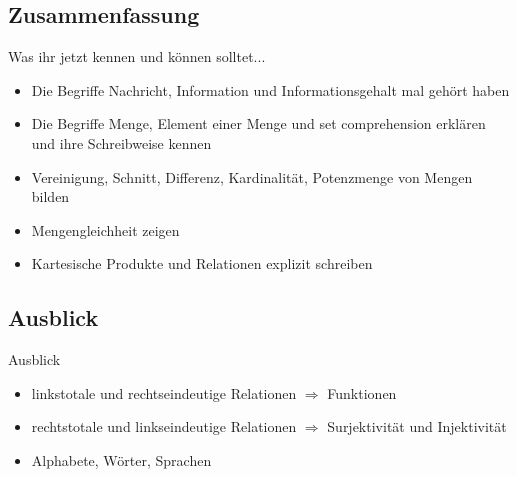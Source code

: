 \subsection{Zusammenfassung}
	\begin{frame}{Was ihr jetzt kennen und können solltet...}
			\begin{itemize}
				\item Die Begriffe Nachricht, Information und Informationsgehalt mal gehört haben
				\item Die Begriffe Menge, Element einer Menge und set comprehension erklären und ihre Schreibweise kennen
				\item Vereinigung, Schnitt, Differenz, Kardinalität, Potenzmenge von Mengen bilden
				\item Mengengleichheit zeigen
				\item Kartesische Produkte und Relationen explizit schreiben
			\end{itemize}
	
	\end{frame}
\subsection{Ausblick}
	\begin{frame}{Ausblick}
		\begin{itemize}
			\item linkstotale und rechtseindeutige Relationen $\Rightarrow$ Funktionen
			\item rechtstotale und linkseindeutige Relationen $\Rightarrow$ Surjektivität und Injektivität
			\item Alphabete, Wörter, Sprachen
		\end{itemize}
	\end{frame}
\section{}
\questionframe
{}
\slideThanks
